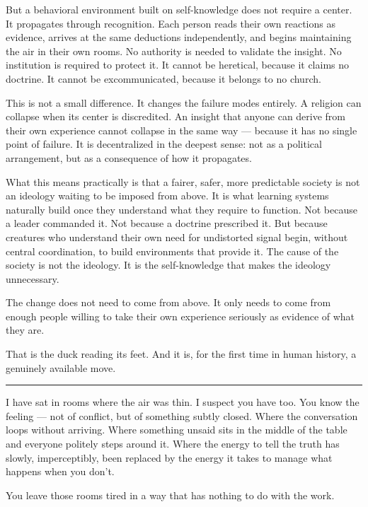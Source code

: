 \documentclass[12pt,letterpaper]{article}
\begin{document}
But a behavioral environment built on self-knowledge does not require a center. It propagates through recognition. Each person reads their own reactions as evidence, arrives at the same deductions independently, and begins maintaining the air in their own rooms. No authority is needed to validate the insight. No institution is required to protect it. It cannot be heretical, because it claims no doctrine. It cannot be excommunicated, because it belongs to no church.

This is not a small difference. It changes the failure modes entirely. A religion can collapse when its center is discredited. An insight that anyone can derive from their own experience cannot collapse in the same way — because it has no single point of failure. It is decentralized in the deepest sense: not as a political arrangement, but as a consequence of how it propagates.

What this means practically is that a fairer, safer, more predictable society is not an ideology waiting to be imposed from above. It is what learning systems naturally build once they understand what they require to function. Not because a leader commanded it. Not because a doctrine prescribed it. But because creatures who understand their own need for undistorted signal begin, without central coordination, to build environments that provide it. The cause of the society is not the ideology. It is the self-knowledge that makes the ideology unnecessary.

The change does not need to come from above. It only needs to come from enough people willing to take their own experience seriously as evidence of what they are.

That is the duck reading its feet. And it is, for the first time in human history, a genuinely available move.

\begin{center}
\rule{\textwidth}{0.4pt}
\end{center}

I have sat in rooms where the air was thin. I suspect you have too. You know the feeling — not of conflict, but of something subtly closed. Where the conversation loops without arriving. Where something unsaid sits in the middle of the table and everyone politely steps around it. Where the energy to tell the truth has slowly, imperceptibly, been replaced by the energy it takes to manage what happens when you don't.

You leave those rooms tired in a way that has nothing to do with the work.
\end{document}
